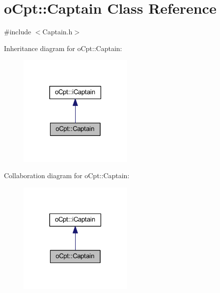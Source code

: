 \hypertarget{classo_cpt_1_1_captain}{}\section{o\+Cpt\+:\+:Captain Class Reference}
\label{classo_cpt_1_1_captain}


{\ttfamily \#include $<$Captain.\+h$>$}



Inheritance diagram for o\+Cpt\+:\+:Captain\+:\nopagebreak
\begin{figure}[H]
\begin{center}
\leavevmode
\includegraphics[width=158pt]{classo_cpt_1_1_captain__inherit__graph}
\end{center}
\end{figure}


Collaboration diagram for o\+Cpt\+:\+:Captain\+:\nopagebreak
\begin{figure}[H]
\begin{center}
\leavevmode
\includegraphics[width=158pt]{classo_cpt_1_1_captain__coll__graph}
\end{center}
\end{figure}

